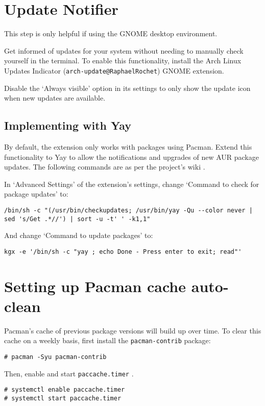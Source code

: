 \documentclass[a4paper]{article}
\begin{document}
\section{Update Notifier}

This step is only helpful if using the GNOME desktop environment.

Get informed of updates for your system without needing to manually check yourself in the terminal.
To enable this functionality, install the Arch Linux Updates Indicator (\lstinline|arch-update@RaphaelRochet|) GNOME extension.

Disable the `Always visible' option in its settings to only show the update icon when new updates are available.

\subsection{Implementing with Yay}

By default, the extension only works with packages using Pacman.
Extend this functionality to Yay to allow the notifications and upgrades of new AUR package updates.
The following commands are as per the project's wiki \cite{arch-update-wiki}.

In `Advanced Settings' of the extension's settings, change `Command to check for package updates' to:
\begin{lstlisting}
/bin/sh -c "(/usr/bin/checkupdates; /usr/bin/yay -Qu --color never | sed 's/Get .*//') | sort -u -t' ' -k1,1"
\end{lstlisting}
And change `Command to update packages' to:
\begin{lstlisting}
kgx -e '/bin/sh -c "yay ; echo Done - Press enter to exit; read"'
\end{lstlisting}

\section{Setting up Pacman cache auto-clean}

Pacman's cache of previous package versions will build up over time.
To clear this cache on a weekly basis, first install the \lstinline|pacman-contrib| package:
\begin{lstlisting}
# pacman -Syu pacman-contrib
\end{lstlisting}

Then, enable and start \lstinline|paccache.timer| \cite{paccache-timer}.

\begin{lstlisting}
# systemctl enable paccache.timer
# systemctl start paccache.timer
\end{lstlisting}
\end{document}
